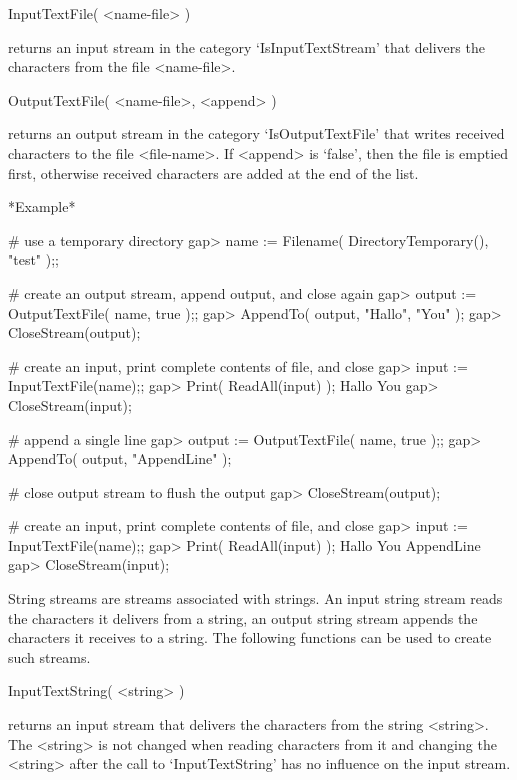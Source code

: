 \>InputTextFile( <name-file> )

returns an input stream in the category `IsInputTextStream' that delivers
the characters from the file <name-file>.

\>OutputTextFile( <name-file>, <append> )

returns  an output stream  in the category `IsOutputTextFile' that writes
received characters  to the file   <file-name>.  If <append> is  `false',
then the  file is emptied first,  otherwise received characters are added
at the end of the list.

*Example*

\begintt
    # use a temporary directory
    gap> name := Filename( DirectoryTemporary(), "test" );;

    # create an output stream, append output, and close again
    gap> output := OutputTextFile( name, true );;
    gap> AppendTo( output, "Hallo\n", "You\n" );
    gap> CloseStream(output);

    # create an input, print complete contents of file, and close
    gap> input := InputTextFile(name);;
    gap> Print( ReadAll(input) );
    Hallo
    You
    gap> CloseStream(input);

    # append a single line
    gap> output := OutputTextFile( name, true );; 
    gap> AppendTo( output, "AppendLine\n" );

    # close output stream to flush the output
    gap> CloseStream(output);

    
    # create an input, print complete contents of file, and close
    gap> input := InputTextFile(name);;
    gap> Print( ReadAll(input) );
    Hallo
    You
    AppendLine
    gap> CloseStream(input);
\endtt


String streams   are streams associated  with   strings.  An input string
stream reads  the characters it delivers  from a string, an output string
stream  appends the characters  it receives  to  a string.  The following
functions can be used to create such streams.

\>InputTextString( <string> )

returns an  input stream that  delivers the  characters  from the  string
<string>.  The  <string> is not changed when  reading characters  from it
and  changing  the <string> after  the  call to `InputTextString'  has no
influence on the input stream.

